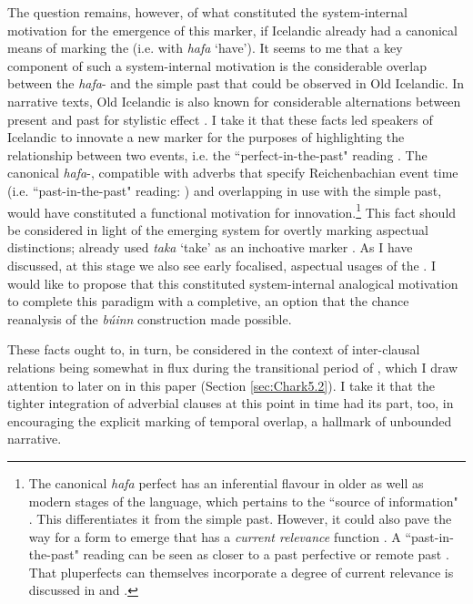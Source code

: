 \documentclass[output=paper,colorlinks,citecolor=brown]{langscibook}
\begin{document}
The question remains, however, of what constituted the system-internal motivation for the emergence of this marker, if Icelandic already had a canonical means of marking the   (i.e. with \textit{hafa} `have'). It seems to me that a key component of such a system-internal motivation is the considerable overlap between the \textit{hafa}-  and the simple past that could be observed in Old Icelandic. In narrative texts, Old Icelandic is also known for considerable  alternations between present and past for stylistic effect \citep{nygaard1905norron, heusler1921}. I take it that these facts led speakers of Icelandic to innovate a new marker for the purposes of highlighting the relationship between two events, i.e. the ``perfect-in-the-past" reading \citep{comrie1976aspect}. The canonical \textit{hafa}-, compatible with adverbs that specify Reichenbachian event time (i.e. ``past-in-the-past" reading: \citeauthor{comrie1976aspect} \citeyear{comrie1976aspect}) and overlapping in use with the simple past, would have constituted a functional motivation for innovation.\footnote{The canonical \textit{hafa} perfect has an inferential flavour in older as well as modern stages of the language, which pertains to the ``source of information" \citep{liberman90}. This differentiates it from the simple past. However, it could also pave the way for a form to emerge that has a \textit{current relevance} function \citep[52]{comrie1976aspect}. A ``past-in-the-past" reading can be seen as closer to a past perfective or remote past \citep{salkie1989perfect}. That pluperfects can themselves incorporate a degree of current relevance is discussed in \citet[102--103]{wada1995english} and \citet[72]{lee2017pluperfect}.} This fact should be considered in light of the emerging system for overtly marking aspectual distinctions;  already used \textit{taka} `take' as an inchoative marker \citep{nordling1928islandskt, holm1967epoker}. As I have discussed, at this stage we also see early focalised, aspectual usages of the . I would like to propose that this constituted system-internal analogical motivation to complete this paradigm with a completive, an option that the chance reanalysis of the \textit{búinn} construction made possible.

These facts ought to, in turn, be considered in the context of inter-clausal relations being somewhat in flux during the transitional period of , which I draw attention to later on in this paper (Section \ref{sec:Chark5.2}). I take it that the tighter integration of adverbial clauses at this point in time had its part, too, in encouraging the explicit marking of temporal overlap, a hallmark of unbounded narrative.
\end{document}
